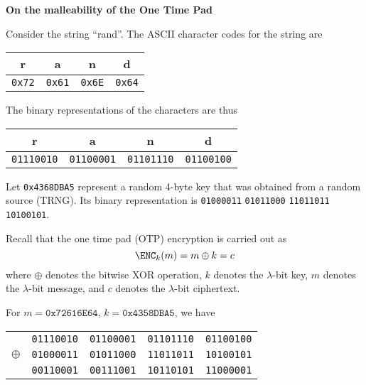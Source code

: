 \documentclass[parskip=half]{scrartcl}
\begin{document}
\begin{center}
  \textbf{On the malleability of the One Time Pad}
\end{center}

Consider the string \enquote{rand}.
The ASCII character codes for the string are
\begin{table}[h!]
  \centering
  \begin{tabular}{@{}cccc@{}}
    r & a & n & d\\
    \midrule
    \texttt{0x72} & \texttt{0x61} & \texttt{0x6E} & \texttt{0x64}
  \end{tabular}
  \vspace*{-.8em}
\end{table}

The binary representations of the characters are thus
\begin{table}[h!]
  \centering
  \begin{tabular}{@{}cccc@{}}
    r & a & n & d\\
    \midrule
    \texttt{01110010} & \texttt{01100001} & \texttt{01101110} & \texttt{01100100}
  \end{tabular}
  \vspace*{-.8em}
\end{table}

Let \texttt{0x4368DBA5} represent a random 4-byte key that was obtained from a random source (TRNG).
Its binary representation is \texttt{01000011} \texttt{01011000} \texttt{11011011} \texttt{10100101}.

Recall that the one time pad (OTP) encryption is carried out as
\[
  \ENC_k(m) = m \oplus k = c
\]
where $\oplus$ denotes the bitwise XOR operation, $k$ denotes the $\lambda$-bit key, $m$ denotes the $\lambda$-bit message, and $c$ denotes the $\lambda$-bit ciphertext.

For $m = \mathtt{0x72616E64}$, $k = \mathtt{0x4358DBA5}$, we have
\begin{table}[h!]
  \centering
  \begin{tabular}{@{}ccccc@{}}
    & \texttt{01110010} & \texttt{01100001} & \texttt{01101110} & \texttt{01100100}\\
    $\oplus$
    & \texttt{01000011} & \texttt{01011000} & \texttt{11011011} & \texttt{10100101}\\
    \midrule
    & \texttt{00110001} & \texttt{00111001} & \texttt{10110101} & \texttt{11000001}
  \end{tabular}
  \vspace*{-.8em}
\end{table}
\end{document}
